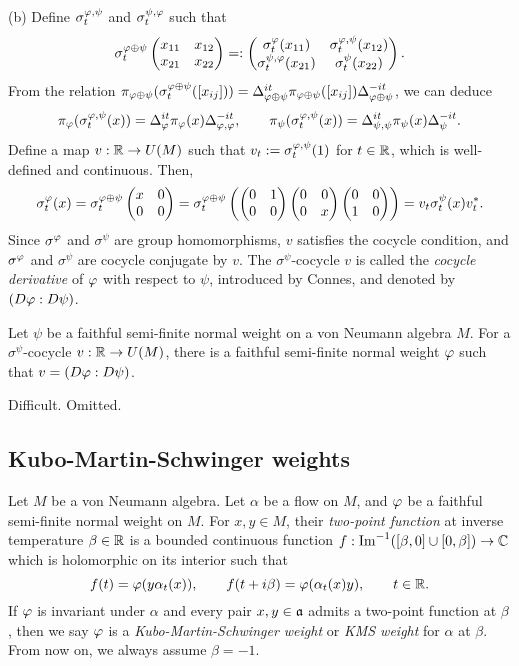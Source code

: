 \documentclass{../../../small}
\begin{document}
\begin{pf}
(b)
Define $\sigma_t^{\varphi,\psi}$ and $\sigma_t^{\psi,\varphi}$ such that
\[\sigma_t^{\varphi\oplus\psi}\begin{pmatrix}x_{11}&x_{12}\\x_{21}&x_{22}\end{pmatrix}=:\begin{pmatrix}\sigma_t^\varphi(x_{11})&\sigma_t^{\varphi,\psi}(x_{12})\\\sigma_t^{\psi,\varphi}(x_{21})&\sigma_t^\psi(x_{22})\end{pmatrix}.\]
From the relation $\pi_{\varphi\oplus\psi}(\sigma_t^{\varphi\oplus\psi}([x_{ij}]))=\Delta_{\varphi\oplus\psi}^{it}\pi_{\varphi\oplus\psi}([x_{ij}])\Delta_{\varphi\oplus\psi}^{-it}$, we can deduce
\[\pi_\varphi(\sigma_t^{\varphi,\psi}(x))=\Delta_\varphi^{it}\pi_\varphi(x)\Delta_{\varphi,\varphi}^{-it},\qquad\pi_\psi(\sigma_t^{\varphi,\psi}(x))=\Delta_{\psi,\psi}^{it}\pi_\psi(x)\Delta_\psi^{-it}.\]
Define a map $v:\mathbb{R}\to U(M)$ such that $v_t:=\sigma_t^{\varphi,\psi}(1)$ for $t\in\mathbb{R}$, which is well-defined and continuous.
Then,
\[\sigma_t^\varphi(x)=\sigma_t^{\varphi\oplus\psi}\begin{pmatrix}x&0\\0&0\end{pmatrix}=\sigma_t^{\varphi\oplus\psi}\left(\begin{pmatrix}0&1\\0&0\end{pmatrix}\begin{pmatrix}0&0\\0&x\end{pmatrix}\begin{pmatrix}0&0\\1&0\end{pmatrix}\right)=v_t\sigma_t^\psi(x)v_t^*.\]
Since $\sigma^\varphi$ and $\sigma^\psi$ are group homomorphisms, $v$ satisfies the cocycle condition, and $\sigma^\varphi$ and $\sigma^\psi$ are cocycle conjugate by $v$.
The $\sigma^\psi$-cocycle $v$ is called the \emph{cocycle derivative} of $\varphi$ with respect to $\psi$, introduced by Connes, and denoted by $(D\varphi:D\psi)$.
\end{pf}

\begin{prop}
Let $\psi$ be a faithful semi-finite normal weight on a von Neumann algebra $M$.
For a $\sigma^\psi$-cocycle $v:\mathbb{R}\to U(M)$, there is a faithful semi-finite normal weight $\varphi$ such that $v=(D\varphi:D\psi)$.
\end{prop}
\begin{pf}
Difficult.
Omitted.
\end{pf}


\subsection{Kubo-Martin-Schwinger weights}


\begin{defn}
Let $M$ be a von Neumann algebra.
Let $\alpha$ be a flow on $M$, and $\varphi$ be a faithful semi-finite normal weight on $M$.
For $x,y\in M$, their \emph{two-point function} at inverse temperature $\beta\in\mathbb{R}$ is a bounded continuous function $f:\operatorname{Im}^{-1}([\beta,0]\cup[0,\beta])\to\mathbb{C}$ which is holomorphic on its interior such that
\[f(t)=\varphi(y\alpha_t(x)),\qquad f(t+i\beta)=\varphi(\alpha_t(x)y),\qquad t\in\mathbb{R}.\]
If $\varphi$ is invariant under $\alpha$ and every pair $x,y\in\mathfrak{a}$ admits a two-point function at $\beta$, then we say $\varphi$ is a \emph{Kubo-Martin-Schwinger weight} or \emph{KMS weight} for $\alpha$ at $\beta$.
From now on, we always assume $\beta=-1$.
\end{defn}
\end{document}
